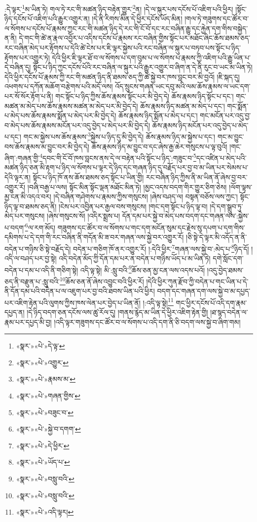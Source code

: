 :དེ་ལྟར་\footnote{«སྣར་»«པེ་»དེ་ལྟ་}མ་ཡིན་ཏེ། གལ་ཏེ་རང་གི་མཚན་ཉིད་བརྟེན་གྱུར་\footnote{«སྣར་»«པེ་»འགྱུར་}ན། །དེ་ལ་སྐུར་པས་དངོས་པོ་འཇིག་པའི་ཕྱིར། །སྟོང་ཉིད་དངོས་པོ་འཇིག་པའི་རྒྱུར་འགྱུར་ན། །དེ་ནི་རིགས་མིན་དེ་ཕྱིར་དངོས་ཡོད་མིན། །གལ་ཏེ་གཟུགས་དང་ཚོར་བ་ལ་སོགས་པ་དངོས་པོ་རྣམས་ཀྱང་རང་གི་མཚན་ཉིད་དེ་རང་གི་ངོ་བོ་དང་རང་བཞིན་རྒྱུ་དང་རྐྱེན་དག་གིས་བསྐྱེད་ན་ནི། དེ་གང་གི་ཚེ་ན་རྣལ་འབྱོར་པ་འདིས་དངོས་པོ་རྣམས་རང་བཞིན་གྱིས་སྟོང་པར་མཐོང་ཞིང་ཆོས་ཐམས་ཅད་རང་བཞིན་མེད་པར་རྟོགས་པ་དེའི་ཚེ་ངེས་པར་ཇི་ལྟར་སྐྱེས་པའི་རང་བཞིན་ལ་སྐུར་པ་བཏབ་པས་སྟོང་པ་ཉིད་རྟོགས་པར་འགྱུར་ཏེ། དེའི་ཕྱིར་ཇི་ལྟར་ཐོ་བ་ལ་སོགས་པ་དག་བུམ་པ་ལ་སོགས་པ་རྣམས་ཀྱི་འཇིག་པའི་རྒྱུ་ཡིན་པ་དེ་བཞིན་དུ། སྟོང་པ་ཉིད་ཀྱང་དངོས་པོའི་རང་བཞིན་ལ་སྐུར་པའི་རྒྱུར་འགྱུར་བ་ཞིག་ན་དེ་ནི་རུང་བ་ཡང་མ་ཡིན་ཏེ། དེའི་ཕྱིར་དངོས་པོ་རྣམས་ཀྱི་རང་གི་མཚན་ཉིད་ནི་ཐམས་ཅད་ཀྱི་ཚེ་སྐྱེ་བར་ཁས་བླང་བར་མི་བྱའོ། །ཇི་སྐད་དུ། འཕགས་པ་དཀོན་མཆོག་བརྩེགས་པའི་མདོ་ལས། འོད་སྲུངས་གཞན་ཡང་དབུ་མའི་ལམ་ཆོས་རྣམས་ལ་ཡང་དག་པར་སོ་སོར་རྟོག་པ་ནི། གང་སྟོང་པ་ཉིད་ཀྱིས་ཆོས་རྣམས་སྟོང་པར་མི་བྱེད་དེ། ཆོས་རྣམས་ཉིད་སྟོང་པ་དང་། གང་མཚན་མ་མེད་པས་ཆོས་རྣམས་མཚན་མ་མེད་པར་མི་བྱེད་དེ། ཆོས་རྣམས་ཉིད་མཚན་མ་མེད་པ་དང་། གང་སྨོན་པ་མེད་པས་ཆོས་རྣམས་སྨོན་པ་མེད་པར་མི་བྱེད་དེ། ཆོས་རྣམས་ཉིད་སྨོན་པ་མེད་པ་དང་། གང་མངོན་པར་འདུ་བྱ་བ་མེད་པས་ཆོས་རྣམས་མངོན་པར་འདུ་བྱེད་པ་མེད་པར་མི་བྱེད་དེ། ཆོས་རྣམས་ཉིད་མངོན་པར་འདུ་བྱེད་པ་མེད་པ་དང་། གང་མ་སྐྱེས་པས་ཆོས་རྣམས་\footnote{«སྣར་»«པེ་»རྣམས་མ་}སྐྱེས་པ་ཉིད་དུ་མི་བྱེད་དེ། ཆོས་རྣམས་ཉིད་མ་སྐྱེས་པ་དང་། གང་མ་བྱུང་བས་ཆོས་རྣམས་མ་བྱུང་བར་མི་བྱེད་དེ། ཆོས་རྣམས་ཉིད་མ་བྱུང་བ་དང་ཞེས་རྒྱ་ཆེར་གསུངས་པ་ལྟ་བུའོ། །གང་ཞིག་:གཞན་གྱི་\footnote{«སྣར་»«པེ་»གཞན་གྱིས་}དབང་གི་ངོ་བོ་ཁས་བླངས་ནས་དེ་ལ་བརྟེན་པའི་སྟོང་པ་ཉིད་:གཟུང་བ་\footnote{«སྣར་»«པེ་»བཟུང་བ་}དང་འཛིན་པ་མེད་པའི་མཚན་ཉིད་ཅན་མི་རྟག་པ་ཉིད་ལ་སོགས་པ་ལྟར་དེ་ཉིད་དང་གཞན་ཉིད་དུ་བརྗོད་པར་བྱ་བ་མ་ཡིན་པར་སེམས་པ་དེའི་ལྟར་ན། སྟོང་པ་ཉིད་ཁོ་ནས་ཆོས་ཐམས་ཅད་སྟོང་པ་ཡིན་གྱི། རང་བཞིན་ཉིད་ཀྱིས་ནི་མ་ཡིན་ནོ་ཞེས་བྱ་བར་འགྱུར་རོ། །བཞི་བརྒྱ་པ་ལས། སྟོང་མིན་སྟོང་ལྡན་མཐོང་མིན་ཏེ། །མྱང་འདས་བདག་གིར་གྱུར་ཅིག་ཅེས། །ལོག་ལྟས་མྱ་ངན་མི་འདའ་བར། །དེ་བཞིན་གཤེགས་པ་རྣམས་ཀྱིས་གསུངས། །ཞེས་བཤད་ལ། བསྟན་བཅོས་ལས་ཀྱང་། སྟོང་ཉིད་ལྟ་བ་ཐམས་ཅད་ནི། །ངེས་པར་འབྱིན་པར་རྒྱལ་བས་གསུངས། །གང་དག་སྟོང་པ་ཉིད་ལྟ་བ། །དེ་དག་སྒྲུབ་ཏུ་མེད་པར་གསུངས། །ཞེས་གསུངས་སོ། །འདིར་སྨྲས་པ། དོན་དམ་པར་སྐྱེ་བ་མེད་པས་བདག་དང་གཞན་ལས་:སྐྱེས་པ་བདག་\footnote{«སྣར་»«པེ་»སྐྱེ་བ་དགག་}ལ་རག་མོད། གཟུགས་དང་ཚོར་བ་ལ་སོགས་པ་གང་དག་མངོན་སུམ་དང་རྗེས་སུ་དཔག་པ་དག་གིས་དམིགས་པ་དེ་དག་གི་རང་བཞིན་ནི་གདོན་མི་ཟ་བར་གཞན་ལས་སྐྱེ་བར་འགྱུར་རོ། །ཅི་སྟེ་དེ་ལྟར་མི་འདོད་ན་ནི་བདེན་པ་གཉིས་ཅི་སྟེ་བརྗོད་དེ། བདེན་པ་གཅིག་ཁོ་ནར་འགྱུར་རོ། །:དེའི་ཕྱིར་\footnote{«སྣར་»«པེ་»དེ་ཕྱིར་}གཞན་ལས་སྐྱེ་བ་:མེད་པ་\footnote{«སྣར་»«པེ་»ཡོད་པ་}ཉིད་དོ། །འདི་ལ་བཤད་པར་བྱ་སྟེ། འདི་བདེན་མོད་ཀྱི་དོན་དམ་པར་ན་བདེན་པ་གཉིས་ཡོད་པ་མ་ཡིན་ཏེ། དགེ་སློང་དག་བདེན་པ་དམ་པ་འདི་ནི་གཅིག་སྟེ། འདི་ལྟ་སྟེ། མི་:སླུ་བའི་\footnote{«སྣར་»«པེ་»བསླུ་བའི་}ཆོས་ཅན་མྱ་ངན་ལས་འདས་པའོ། །འདུ་བྱེད་ཐམས་ཅད་ནི་བརྫུན་པ་:སླུ་བའི་\footnote{«སྣར་»«པེ་»བསླུ་བའི་}ཆོས་ཅན་ནོ་ཞེས་འབྱུང་བའི་ཕྱིར་རོ། །དེའི་ཕྱིར་ཀུན་རྫོབ་ཀྱི་བདེན་པ་གང་ཡིན་པ་དེ་ནི་དོན་དམ་པའི་བདེན་པ་ལ་འཇུག་པར་བྱ་བའི་ཐབས་ཡིན་པའི་ཕྱིར། བདག་དང་གཞན་དག་ལས་སྐྱེ་བ་མ་དཔྱད་པར་འཇིག་རྟེན་པའི་ལུགས་ཀྱིས་ཁས་ལེན་པར་བྱེད་པ་ཡིན་ནོ། །:འདི་ལྟ་སྟེ།\footnote{«སྣར་»«པེ་»འདི་ལྟར།} གང་ཕྱིར་དངོས་པོ་འདི་དག་རྣམ་དཔྱད་ན། །དེ་ཉིད་བདག་ཅན་དངོས་ལས་ཚུ་རོལ་དུ། །གནས་རྙེད་མ་ཡིན་དེ་ཕྱིར་འཇིག་རྟེན་གྱི། །ཐ་སྙད་བདེན་ལ་རྣམ་པར་དཔྱད་མི་བྱ། །འདི་ལྟར་གཟུགས་དང་ཚོར་བ་ལ་སོགས་པ་འདི་དག་ནི་ཅི་བདག་ལས་སྐྱེ་བ་ཞིག་གམ། 